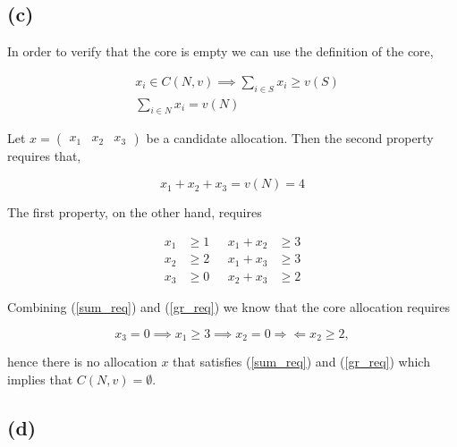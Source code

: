 \documentclass[american]{scrartcl}
\begin{document}
\subsection*{(c)}

In order to verify that the core is empty we can use the definition of the core,

\begin{equation*}
    \begin{split}
        &x_i \in C(N, v) \implies \sum_{i \in S} x_i \geq v(S) \\
        &\sum_{i \in N} x_i = v(N)
    \end{split}
\end{equation*}

Let $x = \begin{pmatrix}
        x_1 & x_2 & x_3
    \end{pmatrix}$ be a candidate allocation. Then the second property requires that,

\begin{equation} \label{sum_req}
    x_1 + x_2 + x_3 = v(N) = 4
\end{equation}

The first property, on the other hand, requires

\begin{equation} \label{gr_req}
    \begin{split}
        x_1 &\geq 1 \\
        x_2 &\geq 2 \\
        x_3 &\geq 0
    \end{split}
    \ \ \
    \begin{split}
        x_1 + x_2 &\geq 3\\
        x_1 + x_3 &\geq 3\\
        x_2 + x_3 &\geq 2
    \end{split}
\end{equation}

Combining (\ref{sum_req}) and (\ref{gr_req}) we know that the core allocation requires

\begin{equation}
    x_3 = 0 \implies x_1 \geq 3 \implies x_2 = 0 \Rightarrow\Leftarrow x_2 \geq 2,
\end{equation}

hence there is no allocation $x$ that satisfies (\ref{sum_req}) and (\ref{gr_req}) which implies that $C(N, v) = \emptyset$.

\subsection*{(d)}
\end{document}
